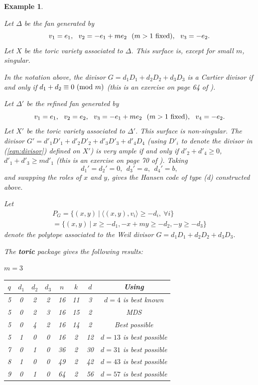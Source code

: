 \documentclass[12pt]{article}
\newtheorem{example}[theorem]{Example}
\begin{document}
\begin{example}
\label{example:fan2}

Let $\Delta$ be the fan generated by 
\[
v_1=e_1,\ \ v_2=-e_1+me_2\ \ (m>1\ {\rm fixed}),\ \ v_3=-e_2.
\]
Let $X$ be the toric variety associated to $\Delta$.
This surface is, except for small $m$, singular.

In the notation above, the divisor $G=d_1D_1+d_2D_2+d_3D_3$
is a Cartier divisor if and only if
$d_1 + d_2\equiv 0\ ({\rm mod}\ m)$ (this is
an exercise on page 64 of \cite{F}).

Let $\Delta'$ be the refined fan generated by 
\[
v_1=e_1,\ \ v_2=e_2,\ \ v_3=-e_1+me_2\ \ (m>1\ {\rm fixed}),
\ \ v_4=-e_2.
\]
Let $X'$ be the toric variety associated to $\Delta'$.
This surface is non-singular.
The divisor $G'=d'_1D'_1+d'_2D'_2+d'_3D'_3+d'_4D_4$
(using $D'_i$ to denote the divisor in
(\ref{eqn:divisor}) defined on $X'$)
is very ample if and only if
$d'_2+d'_4\geq 0$, $d'_1+d'_3\geq md'_1$ (this is an exercise 
on page 70 of \cite{F}).
Taking 
\[
d_1'=d_2'=0, \ \ d_3'=a,\ \ d_4'=b,
\]
and swapping the roles of $x$ and $y$, gives the Hansen code
of type (d) constructed above.

Let 
\[
\begin{array}{c}
P_G=\{(x,y)\ |\ \langle (x,y),v_i\rangle \geq -d_i, \ \forall i\}\\
=\{(x,y)\ |\ x \geq -d_1, -x+my \geq -d_2, -y \geq -d_3 
\}
\end{array}
\]
denote the polytope associated to the Weil
divisor $G=d_1D_1+d_2D_2+d_3D_3$.

The {\bf toric} package gives the following results:

$m=3$

\begin{center}
\begin{tabular}{|c|c|c|c|c|c|c|c|}\hline
$q$ & $d_1$ & $d_2$ & $d_3$ & $n$ & $k$ & $d$ & Using \cite{B} \\ \hline
5    & 0  &  2 & 2  & 16  & 11  & 3 & $d=4$ is best known  \\
5    & 0  &  2 & 3  & 16  & 15  & 2 & MDS  \\
5    & 0  &  4 & 2  & 16  & 14  & 2 & Best possible  \\
5    & 1  &  0 & 0  & 16  & 2  & 12 & $d=13$ is best possible  \\
7    & 0  &  1 & 0  & 36  & 2  & 30 & $d=31$ is best possible  \\
8    & 1  &  0 & 0  & 49  & 2  & 42 & $d=43$ is best possible  \\
9    &  0 &  1 & 0  & 64  & 2  & 56 & $d=57$ is best possible  \\
\hline
\end{tabular}
\end{center}


\end{example}
\end{document}
